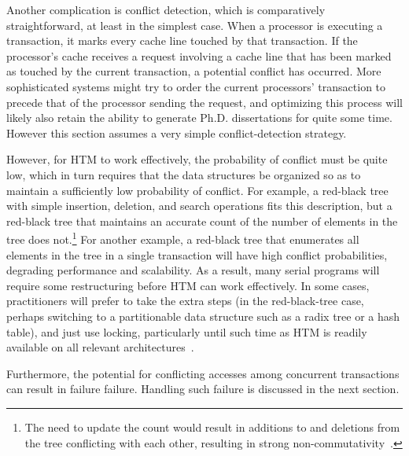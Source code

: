 Another complication is conflict detection, which is comparatively
straightforward, at least in the simplest case.
When a processor is executing a transaction, it marks every cache line
touched by that transaction.
If the processor's cache receives a request involving a cache line that
has been marked as touched by the current transaction, a potential
conflict has occurred.
More sophisticated systems might try to order the current processors'
transaction to precede that of the processor sending the request, and
optimizing this process will likely also retain the ability to generate
Ph.D. dissertations for quite some time.
However this section assumes a very simple conflict-detection strategy.

However, for HTM to work effectively, the probability of conflict must
be quite low, which in turn requires that the data structures
be organized so as to maintain a sufficiently low probability of conflict.
For example, a red-black tree with simple insertion, deletion, and search
operations fits this description, but a red-black
tree that maintains an accurate count of the number of elements in
the tree does not.\footnote{
	The need to update the count would result in additions to and
	deletions from the tree conflicting with each other, resulting
	in strong non-commutativity~\cite{HagitAttiya2011LawsOfOrder,Attiya:2011:LOE:1925844.1926442,PaulEMcKenney2011SNC}.}
For another example, a red-black tree that enumerates all elements in
the tree in a single transaction will have high conflict probabilities,
degrading performance and scalability.
As a result, many serial programs will require some restructuring before
HTM can work effectively.
In some cases, practitioners will prefer to take the extra steps
(in the red-black-tree case, perhaps switching to a partitionable
data structure such as a radix tree or a hash table), and just
use locking, particularly until such time as HTM is readily available
on all relevant
architectures~\cite{CliffClick2009AzulHTM}.

\QuickQuizEnd

Furthermore, the potential for conflicting accesses among concurrent
transactions can result in failure failure.
Handling such failure is discussed in the next section.

